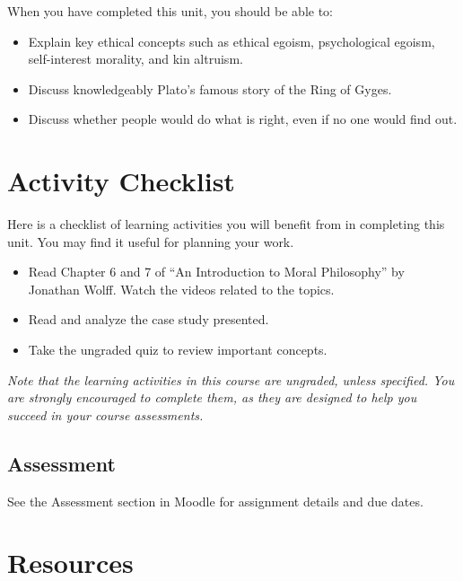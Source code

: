 \documentclass[
]{book}
\providecommand{\tightlist}{%
  \setlength{\itemsep}{0pt}\setlength{\parskip}{0pt}}
\begin{document}
When you have completed this unit, you should be able to:

\begin{itemize}
\tightlist
\item
  Explain key ethical concepts such as ethical egoism, psychological egoism, self-interest morality, and kin altruism.
\item
  Discuss knowledgeably Plato's famous story of the Ring of Gyges.
\item
  Discuss whether people would do what is right, even if no one would find out.
\end{itemize}

\hypertarget{activity-checklist-1}{%
\section*{Activity Checklist}\label{activity-checklist-1}}

Here is a checklist of learning activities you will benefit from in completing this unit. You may find it useful for planning your work.

\begin{itemize}
\tightlist
\item
  Read Chapter 6 and 7 of ``An Introduction to Moral Philosophy'' by Jonathan Wolff. Watch the videos related to the topics.
\item
  Read and analyze the case study presented.
\item
  Take the ungraded quiz to review important concepts.
\end{itemize}

\emph{Note that the learning activities in this course are ungraded, unless specified. You are strongly encouraged to complete them, as they are designed to help you succeed in your course assessments.}

\hypertarget{assessment-2}{%
\subsection*{Assessment}\label{assessment-2}}

See the Assessment section in Moodle for assignment details and due dates.

\hypertarget{resources-1}{%
\section*{Resources}\label{resources-1}}
\end{document}
